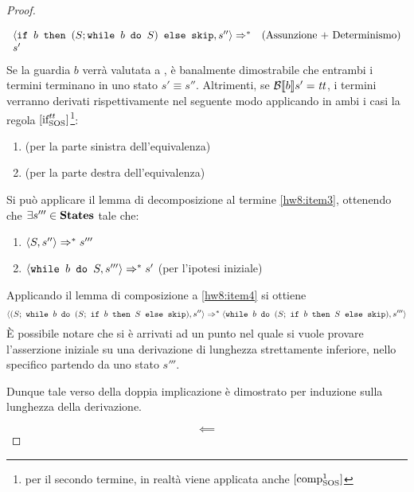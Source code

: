 \begin{proof}
\begin{itemize}
$$\begin{array}{lr}
  \langle{}\mbox{\normalfont{\texttt{if }}} b \textrm{\normalfont{\texttt{ then }}} (S;\mbox{\normalfont{\texttt{while }}} b \textrm{\normalfont{\texttt{ do }}} S) \textrm{\normalfont{\texttt{ else }}} \textrm{\normalfont{\texttt{skip}}}, s''\rangle{} \Rightarrow^{*} & (\text{Assunzione + Determinismo})\\
  s'
  \end{array}
  $$
  Se la guardia $b$ verrà valutata a \semfalse, è banalmente dimostrabile che
  entrambi i termini terminano in uno stato $s' \equiv{} s''$.
  Altrimenti, se $\mathcal{B} \llbracket b \rrbracket s' = \mbox{\textit{tt}}$, i termini verranno derivati
  rispettivamente nel seguente modo applicando in ambi i casi la regola
  $[ \textrm{\normalfont{if}} ^ \textrm{\normalfont{\ensuremath{\mbox{\textit{tt}}}}} _\textrm{\normalfont{SOS}} ]$\footnote{per il secondo termine, in realtà viene applicata anche
  $[ \textrm{\normalfont{comp}} ^ \textrm{\normalfont{1}} _\textrm{\normalfont{SOS}} ]$}:
  \begin{enumerate}
    \item {} (per la parte sinistra dell'equivalenza)
    \label{hw8:item3}
    \item {}
      (per la parte destra dell'equivalenza)
  \end{enumerate}
  Si può applicare il lemma di decomposizione al termine \ref{hw8:item3},
  ottenendo che $\exists{s'''} \in \mbox{\textbf{States}}$ tale che:
  \begin{enumerate}[label=(\alph*)]
    \item $\langle{}S, s''\rangle{} \Rightarrow^{*} s'''$
    \label{hw8:item4}
    \item $\langle{}\mbox{\normalfont{\texttt{while }}} b \textrm{\normalfont{\texttt{ do }}} S, s'''\rangle{} \Rightarrow^{*} s'$ (per l'ipotesi iniziale)
    \label{hw8:item5}
  \end{enumerate}
  Applicando il lemma di composizione a \ref{hw8:item4} si ottiene
  $$
  \confSs{(S;\ \wbS{b}{(S;\ \ifABC{b}{S}{\skipForFriends})}}{s''}
    \Rar{*}
  \confSs{\wbS{b}{(S;\ \ifABC{b}{S}{\skipForFriends})}}{s'''}
  $$
  È possibile notare che si è arrivati ad un punto nel quale si vuole provare
  l'asserzione iniziale su una derivazione di lunghezza strettamente inferiore,
  nello specifico partendo da uno stato $s'''$.

  Dunque tale verso della doppia implicazione è dimostrato per induzione sulla
  lunghezza della derivazione.
\end{itemize}


$$
\boxed{\impliedby}
$$

\end{proof}
